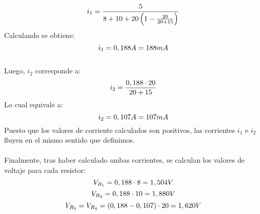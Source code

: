 \begin{example}
\begin {equation*}
\notag i_1=\frac{5}{8+10+20\left(1-\frac{20}{20+15}\right)}
\end {equation*}Calculando se obtiene:
\begin {equation*}
\notag i_1 = 0,188A = 188mA
\end {equation*}\\Luego, $i_2$ corresponde a:
\begin {equation*}
\notag i_2 = \frac{0,188 \cdot 20}{20+15}
\end {equation*}
Lo cual equivale a: 
\begin {equation*}
\notag i_2 = 0,107 A=107mA
\end {equation*}
Puesto que los valores de corriente calculados son positivos, las corrientes $i_1$ e $i_2$ fluyen en el mismo sentido que definimos.\\\\
Finalmente, tras haber calculado ambas corrientes, se calculan los valores de voltaje para cada resistor:
\begin {equation*}
\notag V_{R_1}=0,188\cdot8 = 1,504 V
\end {equation*}
\begin {equation*}
\notag V_{R_2} = 0,188 \cdot10 = 1,880 V
\end {equation*}
\begin {equation*}
\notag V_{R_3} = V_{R_4} = (0,188-0,107) \cdot 20 = 1,620 V
\end {equation*}




\end{example}

